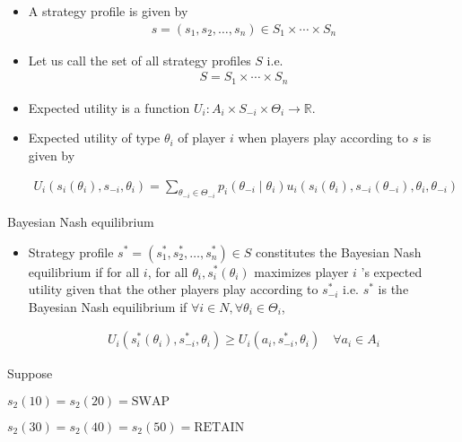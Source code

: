\documentclass[12pt,a4paper,fleqn]{article}
\begin{document}
\begin{itemize}
    \item A strategy profile is given by
    \begin{align*}
    s=\left(s_1, s_2, \ldots, s_n\right) \in S_1 \times \cdots \times S_n
    \end{align*}
    
    \item Let us call the set of all strategy profiles \(S\) i.e.
    \begin{align*}
    S=S_1 \times \cdots \times S_n
    \end{align*}
    
    \item Expected utility is a function \(U_i: A_{i} \times S_{-i} \times \Theta_i \rightarrow \mathbb{R}\).
    \item Expected utility of type \(\theta_i\) of player \(i\) when players play according to \(s\) is given by
    
    \begin{align*}
    U_i\left(s_i\left(\theta_i\right), s_{-i}, \theta_i\right)=\sum_{\theta_{-i} \in \Theta_{-i}} p_i\left(\theta_{-i} \mid \theta_i\right) u_i\left(s_i\left(\theta_i\right), s_{-i}\left(\theta_{-i}\right), \theta_i, \theta_{-i}\right)
    \end{align*}
\end{itemize}

Bayesian Nash equilibrium
\begin{itemize}
\item Strategy profile \(s^*=\left(s_1^*, s_2^*, \ldots, s_n^*\right) \in S\) constitutes the Bayesian Nash equilibrium if for all \(i\), for all \(\theta_i, s_i^*\left(\theta_i\right)\) maximizes player \(i\) 's expected utility given that the other players play according to \(s_{-i}^*\) i.e. \(s^*\) is the Bayesian Nash equilibrium if \(\forall i \in N, \forall \theta_i \in \Theta_i\),

\begin{align*}
U_i\left(s_i^*\left(\theta_i\right), s_{-i}^*, \theta_i\right) \geq U_i\left(a_i, s_{-i}^*, \theta_i\right) \quad \forall a_i \in A_i
\end{align*}
\end{itemize}

Suppose 

\(s_{2}(10)=s_{2}(20)=\text{SWAP}\)  

\(s_{2}(30)=s_{2}(40)=s_{2}(50)=\text{RETAIN}\)  
\end{document}
